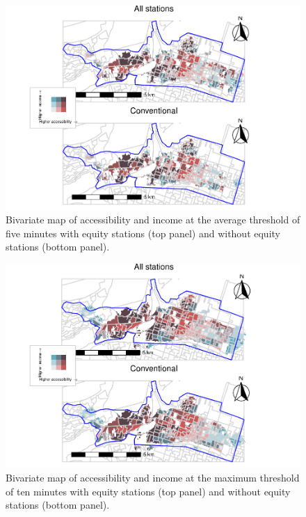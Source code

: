 \documentclass[]{elsarticle} %
\begin{document}
\begin{figure}
\includegraphics[width=1.2\linewidth]{Bike-share-spatial-equity-R1_files/figure-latex/figure-bi-map-threshold-5-1} \caption{\label{fig-bivariate-map-threshold-5}Bivariate map of accessibility and income at the average threshold of five minutes with equity stations (top panel) and without equity stations (bottom panel).}\label{fig:figure-bi-map-threshold-5}
\end{figure}

\begin{figure}
\includegraphics[width=1.2\linewidth]{Bike-share-spatial-equity-R1_files/figure-latex/figure-bi-map-threshold-10-1} \caption{\label{fig-bivariate-map-threshold-10}Bivariate map of accessibility and income at the maximum threshold of ten minutes with equity stations (top panel) and without equity stations (bottom panel).}\label{fig:figure-bi-map-threshold-10}
\end{figure}
\end{document}
